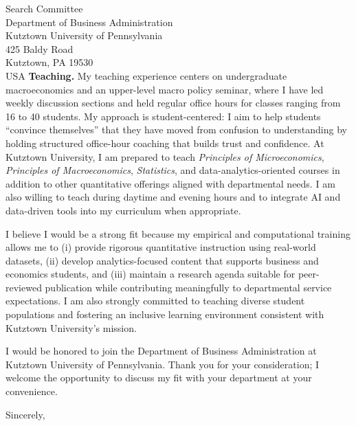 \documentclass[11pt,letterpaper]{letter}
\begin{document}
\begin{letter}{Search Committee \\
Department of Business Administration \\
Kutztown University of Pennsylvania \\
425 Baldy Road \\
Kutztown, PA 19530 \\ USA}
\textbf{Teaching.} My teaching experience centers on undergraduate macroeconomics and an upper-level macro policy seminar, where I have led weekly discussion sections and held regular office hours for classes ranging from 16 to 40 students. My approach is student-centered: I aim to help students “convince themselves” that they have moved from confusion to understanding by holding structured office-hour coaching that builds trust and confidence. At Kutztown University, I am prepared to teach \textit{Principles of Microeconomics}, \textit{Principles of Macroeconomics}, \textit{Statistics}, and data-analytics-oriented courses in addition to other quantitative offerings aligned with departmental needs. I am also willing to teach during daytime and evening hours and to integrate AI and data-driven tools into my curriculum when appropriate.

I believe I would be a strong fit because my empirical and computational training allows me to (i) provide rigorous quantitative instruction using real-world datasets, (ii) develop analytics-focused content that supports business and economics students, and (iii) maintain a research agenda suitable for peer-reviewed publication while contributing meaningfully to departmental service expectations. I am also strongly committed to teaching diverse student populations and fostering an inclusive learning environment consistent with Kutztown University’s mission.

I would be honored to join the Department of Business Administration at Kutztown University of Pennsylvania. Thank you for your consideration; I welcome the opportunity to discuss my fit with your department at your convenience.

\closing{Sincerely,}

\end{letter}
\end{document}
